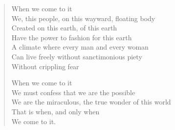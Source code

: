 \documentclass[12pt, openany, letterpaper]{memoir}
\begin{document}
\begin{verse}
	When we come to it\\
	We, this people, on this wayward, floating body\\
	Created on this earth, of this earth\\
	Have the power to fashion for this earth\\
	A climate where every man and every woman\\
	Can live freely without sanctimonious piety\\
	Without crippling fear
	
	When we come to it\\
	We must confess that we are the possible\\
	We are the miraculous, the true wonder of this world\\
	That is when, and only when\\
	We come to it.
\end{verse}
\end{document}
